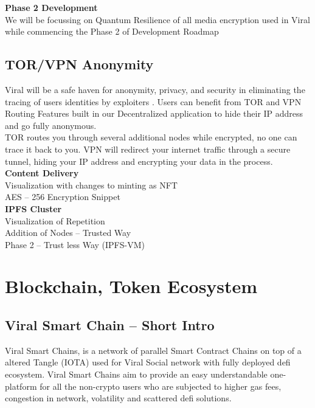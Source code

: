 \documentclass[10pt]{article}
\begin{document}
\textbf{Phase 2 Development}\\

We will be focussing on Quantum Resilience of all media encryption used in Viral while commencing the Phase 2 of Development Roadmap\\

\subsection{TOR/VPN Anonymity}

Viral will be a safe haven for anonymity, privacy, and security in eliminating the tracing of users\textsc{} identities by exploiters . Users can benefit from TOR and VPN Routing Features built in our Decentralized application to hide their IP address and go fully anonymous.\\

TOR routes you through several additional nodes while encrypted, no one can trace it back to you. VPN will redirect your internet traffic through a secure tunnel, hiding your IP address and encrypting your data in the process.\\

\textbf{Content Delivery}\\

Visualization with changes to minting as NFT\\

AES – 256 Encryption Snippet\\

\textbf{IPFS Cluster}\\

Visualization of Repetition\\

Addition of Nodes – Trusted Way\\

Phase 2 – Trust less Way (IPFS-VM)\\

\section{Blockchain, Token Ecosystem}

\subsection{Viral Smart Chain – Short Intro}

Viral Smart Chains, is a network of parallel Smart Contract Chains on top of a altered Tangle (IOTA) used for Viral Social network with fully deployed defi ecosystem. Viral Smart Chains aim to provide an easy understandable one-platform for all the non-crypto users who are subjected to higher gas fees, congestion in network, volatility and scattered defi solutions. \\
\end{document}
